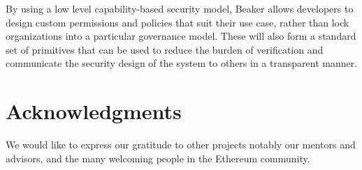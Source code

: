 \documentclass[english,a4paper]{article}
\begin{document}
By using a low level capability-based security model, Beaker allows
developers to design custom permissions and policies that suit their use
case, rather than lock organizations into a particular governance model.
These will also form a standard set of primitives that can be used to
reduce the burden of verification and communicate the security design of
the system to others in a transparent manner.

\section{Acknowledgments}\label{acknowledgments}
We would like to express our gratitude to other projects notably our
mentors and advisors, and the many welcoming people in the Ethereum
community.
\end{document}
